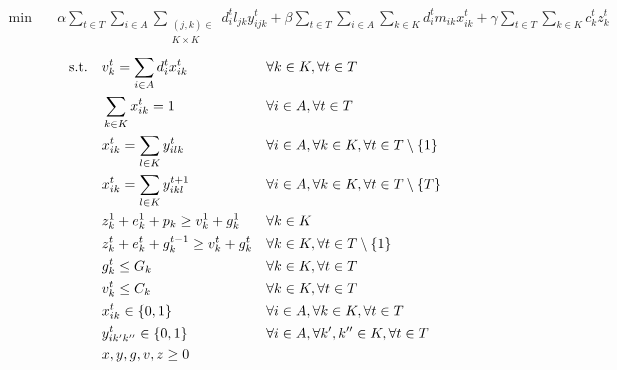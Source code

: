 \begin{align}
    \min\quad       & \alpha \sum_{t \in T} \sum_{i \in A} \sum_{\substack{(j,k) \in \\ K \times K}}d^{t}_{i} l_{jk} y^t_{ijk} + \beta \sum_{t \in T} \sum_{i \in A} \sum_{k \in K}d^{t}_{i} m_{ik} x^t_{ik} + \gamma \sum_{t \in T} \sum_{k \in K}{c_k^t z_k^t}
    \label{eq:dinamico-obj}
\end{align}
\vspace*{-6mm}
\begin{align}
    \text{s.t.\quad}
    \label{eq:dinamico-c1}
    & v_k^t = \sum_{i \in A}{d^t_i x_{ik}^t}        &   & \forall k \in K, \forall t \in T                                  \\
    \label{eq:dinamico-c2}
    & \sum_{k \in K}{x_{ik}^t} = 1                  &   & \forall i \in A, \forall t \in T                                  \\
    \label{eq:dinamico-c3}
    & x_{ik}^t = \sum_{l \in K}{y_{ilk}^t}          &   & \forall i \in A, \forall k \in K, \forall t \in T \setminus \{1\} \\
    \label{eq:dinamico-c4}
    & x_{ik}^t = \sum_{l \in K}{y_{ikl}^{t+1}}      &   & \forall i \in A, \forall k \in K, \forall t \in T \setminus \{T\} \\
    \label{eq:dinamico-c5}
    & z_k^1 + e_k^1 + p_k \geq v_k^1 + g_k^1        &   & \forall k \in K                                                   \\
    \label{eq:dinamico-c6}
    & z_k^t + e_k^t + g_k^{t-1} \geq v_k^t + g_k^t  &   & \forall k \in K, \forall t \in T \setminus \{1\}                  \\
    \label{eq:dinamico-c7}
    & g_k^t \leq G_k                                &   & \forall k \in K, \forall t \in T                                  \\
    \label{eq:dinamico-c8}
    & v_k^t \leq C_k                                &   & \forall k \in K, \forall t \in T                                  \\
    \label{eq:dinamico-c9}
    & x_{ik}^t \in \{0,1\}                          &   & \forall i \in A, \forall k \in K, \forall t \in T                 \\
    \label{eq:dinamico-c10}
    & y_{ik'k''}^t \in \{0,1\}                      &   & \forall i \in A, \forall k', k'' \in K, \forall t \in T           \\
    \label{eq:dinamico-c11}
    & x, y, g, v, z \geq 0                          &   &
\end{align}
